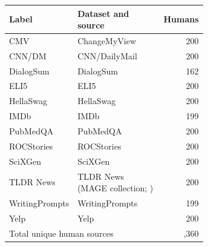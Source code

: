 \begin{tabular}{@{}l>{\raggedright\arraybackslash}p{0.65\linewidth}r@{}}
\toprule
Label & Dataset and source & Humans \\
\midrule
CMV & ChangeMyView \citep{tan2016winning} & 200 \\
CNN/DM & CNN/DailyMail \citep{hermann2015teaching,nallapati2016abstractive} & 200 \\
DialogSum & DialogSum \citep{chen2021dialogsum} & 162 \\
ELI5 & ELI5 \citep{fan2019eli5} & 200 \\
HellaSwag & HellaSwag \citep{zellers2019hellaswag} & 200 \\
IMDb & IMDb \citep{maas2011learning} & 199 \\
PubMedQA & PubMedQA \citep{jin2019pubmedqa} & 200 \\
ROCStories & ROCStories \citep{mostafazadeh2016corpus} & 200 \\
SciXGen & SciXGen \citep{chen2021scixgen} & 200 \\
TLDR News & TLDR News (MAGE collection; \citealp{li2024mage}) & 200 \\
WritingPrompts & WritingPrompts \citep{fan2018hierarchical} & 199 \\
Yelp & Yelp \citep{zhang2015character} & 200 \\
\midrule
\multicolumn{2}{l}{Total unique human sources} & 2,360 \\
\bottomrule
\end{tabular}
